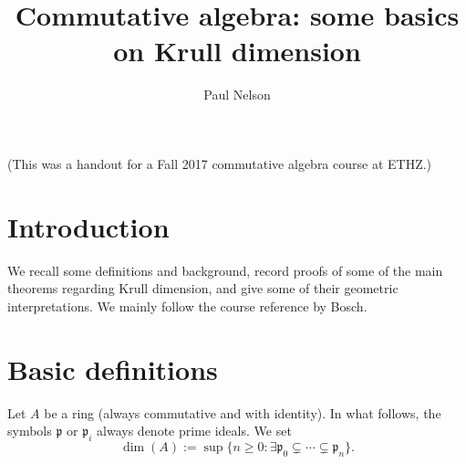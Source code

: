 \documentclass[reqno]{amsart}
\author{Paul Nelson}
\title{Commutative algebra: some basics on Krull dimension}
\begin{document}
\maketitle
\tableofcontents

(This was a handout for a Fall 2017 commutative algebra course at ETHZ.)

\section{Introduction}
\label{sec:org2573665}

We recall some definitions and background, record proofs of some
of the main theorems regarding Krull dimension, and give some of
their geometric interpretations.
We mainly follow the course reference by Bosch.

\section{Basic definitions}
\label{sec:orgdb2d3a0}

Let \(A\) be a ring (always commutative and with identity).
In what follows,
the symbols \(\mathfrak{p}\) or \(\mathfrak{p}_i\)
always denote prime ideals.
We set
\[
    \dim(A) :=
    \sup \{n \geq 0 : \exists \mathfrak{p}_0 \subsetneq \dotsb \subsetneq \mathfrak{p}_n \}.
  \]
\end{document}
